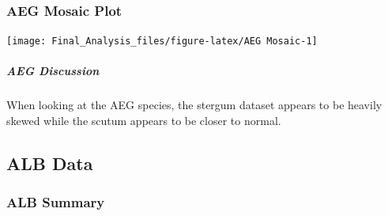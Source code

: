 \subsubsection{AEG Mosaic Plot}\label{aeg-mosaic-plot}

\begin{Shaded}
\begin{Highlighting}[]
 \NormalTok{)}
\end{Highlighting}
\end{Shaded}

\begin{center}\texttt{[image: Final\_Analysis\_files/figure-latex/AEG Mosaic-1]} \end{center}

\subparagraph{AEG Discussion}\label{aeg-discussion}

When looking at the AEG species, the stergum dataset appears to be
heavily skewed while the scutum appears to be closer to normal.

\subsection{ALB Data}\label{alb-data}

\subsubsection{ALB Summary}\label{alb-summary}

\begin{Shaded}
\begin{Highlighting}[]
\NormalTok{(}\NormalTok{(ALB[,}\NormalTok{:}\NormalTok{]), } \NormalTok{)}
\end{Highlighting}
\end{Shaded}

